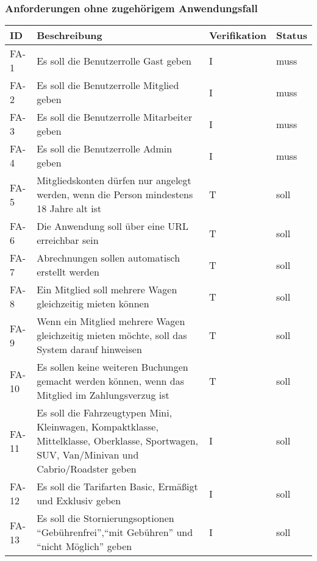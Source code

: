 \subsubsection{Anforderungen ohne zugehörigem Anwendungsfall}
    \begin{longtable}{|m{2cm}|m{6.5cm}|P{2.5cm}|P{2.5cm}|}
            \hline
        \textbf{ID}     & \textbf{Beschreibung} & \textbf{Verifikation} & \textbf{Status} \\
        \hline
        FA-1           & Es soll die Benutzerrolle Gast geben & I & muss \\
        \hline
        FA-2           & Es soll die Benutzerrolle Mitglied geben &  I & muss \\
        \hline
        FA-3           & Es soll die Benutzerrolle Mitarbeiter geben &  I & muss \\
        \hline
        FA-4           & Es soll die Benutzerrolle Admin geben &  I & muss \\
        \hline
        FA-5           & Mitgliedskonten dürfen nur angelegt werden, wenn die Person mindestens 18 Jahre alt ist &  T & soll\\
        \hline
        FA-6           & Die Anwendung soll über eine URL erreichbar sein &  T & soll \\
        \hline
        FA-7           & Abrechnungen sollen automatisch erstellt werden &  T & soll\\
        \hline
        FA-8           & Ein Mitglied soll mehrere Wagen gleichzeitig mieten können &  T & soll\\
        \hline
        FA-9           & Wenn ein Mitglied mehrere Wagen gleichzeitig mieten möchte, soll das System darauf hinweisen & T & soll\\
        \hline
        FA-10           & Es sollen keine weiteren Buchungen gemacht werden können, wenn das Mitglied im Zahlungsverzug ist &  T & soll\\
        \hline
        FA-11           & Es soll die Fahrzeugtypen Mini, Kleinwagen, Kompaktklasse, Mittelklasse, Oberklasse, Sportwagen, SUV, Van/Minivan und Cabrio/Roadster geben  & I & soll \\
        \hline
        FA-12           & Es soll die Tarifarten Basic, Ermäßigt und Exklusiv geben  & I & soll \\
        \hline
        FA-13           & Es soll die Stornierungsoptionen \enquote{Gebührenfrei},\enquote{mit Gebühren} und \enquote{nicht Möglich} geben  & I & soll \\

\end{longtable}
